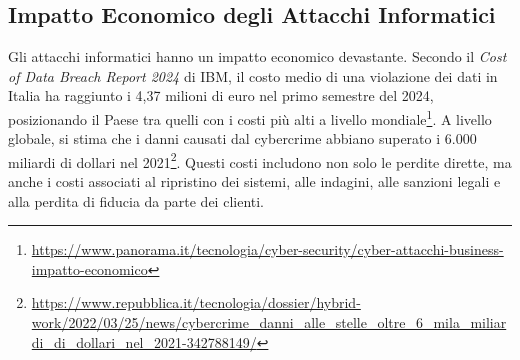 \subsection*{Impatto Economico degli Attacchi Informatici}
Gli attacchi informatici hanno un impatto economico devastante. Secondo il \textit{Cost of Data Breach Report 2024} di IBM, il costo medio di una violazione dei dati in Italia ha raggiunto i 4,37 milioni di euro nel primo semestre del 2024, posizionando il Paese tra quelli con i costi più alti a livello mondiale\footnote{\url{https://www.panorama.it/tecnologia/cyber-security/cyber-attacchi-business-impatto-economico}}. A livello globale, si stima che i danni causati dal cybercrime abbiano superato i 6.000 miliardi di dollari nel 2021\footnote{\url{https://www.repubblica.it/tecnologia/dossier/hybrid-work/2022/03/25/news/cybercrime_danni_alle_stelle_oltre_6_mila_miliardi_di_dollari_nel_2021-342788149/}}. Questi costi includono non solo le perdite dirette, ma anche i costi associati al ripristino dei sistemi, alle indagini, alle sanzioni legali e alla perdita di fiducia da parte dei clienti.


